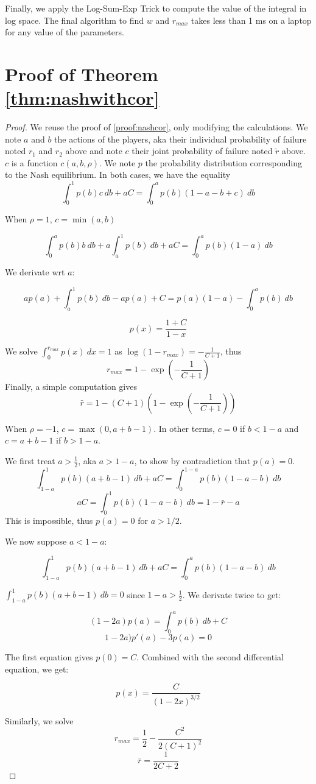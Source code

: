 \documentclass[preprint,12pt,authoryear,doubleblind]{elsarticle}
\theoremstyle{definition}
\begin{document}
Finally, we apply the Log-Sum-Exp Trick to compute the value of the integral in log space. The final algorithm to find $w$ and ${r_{max}}$ takes less than 1 ms on a laptop for any value of the parameters.

\section{Proof of Theorem \ref{thm:nashwithcor}}
\label{proof:nashwithcor}

\nashwithcor*
\begin{proof}
        We reuse the proof of \ref{proof:nashcor}, only modifying the calculations.
    We note $a$ and $b$ the actions of the players, aka their individual probability of failure noted $r_1$ and $r_2$ above and note $c$ their joint probability of failure noted $\tilde r$ above. $c$ is a function $c(a,b,\rho)$. We note $p$ the probability distribution corresponding to the Nash equilibrium.
    In both cases, we have the equality $$\int_0^1 p(b) c~db + a C = \int_0^a p(b)(1-a-b+c)~db$$

    When $\rho = 1$, $c = \min(a, b)$

    $$\int_0^a p(b) b~db + a \int_a^1 p(b)~db + a C = \int_0^a p(b)(1-a)~db$$

    We derivate wrt $a$:

    $$a p(a) + \int_a^1 p(b)~db - ap(a) + C = p(a)(1-a) - \int_0^a p(b)~db$$

    $$p(x) = \frac{1+C}{1-x}$$

    We solve $\int_0^{r_{max}} p(x)~dx=1$ as $\log(1-r_{max}) = -\frac{1}{C+1}$, thus
    $$r_{max} = 1 - \exp\left(-\frac{1}{C+1}\right)$$
    Finally, a simple computation gives $$\bar r = 1 - (C+1)\left(1-\exp\left(-\frac{1}{C+1}\right)\right)$$
    
    

    When $\rho = -1$, $c = \max(0, a+b-1)$. In other terms, $c=0$ if $b<1-a$ and $c=a+b-1$ if $b>1-a$.

    We first treat $a>\frac{1}{2}$, aka $a>1-a$, to show by contradiction that $p(a) = 0$.
    $$\int_{1-a}^1 p(b)(a+b-1)~db+ aC = \int_0^{1-a} p(b)(1-a-b)~db$$
    $$aC = \int_0^1 p(b)(1-a-b)~db = 1 - \bar r - a$$
    This is impossible, thus $p(a) = 0$ for $a> 1/2$.

    We now suppose $a < 1-a$:

    $$\int_{1-a}^1 p(b)(a+b-1)~db + aC = \int_0^a p(b) (1-a-b)~db$$

    $\int_{1-a}^1 p(b)(a+b-1)~db = 0$ since $1-a >  \frac12$.
    We derivate twice to get:

    $$(1-2a)p(a) = \int_0^a p(b)~db + C$$
    $$1-2a) p'(a) - 3p(a) = 0$$

    The first equation gives $p(0) = C$. Combined with the second differential equation, we get:

    $$p(x) =\frac{C}{(1-2x)^{3/2}}$$

    Similarly, we solve  $$r_{max} = \frac{1}{2} - \frac{C^2}{2(C+1)^2}$$
    $$\bar r = \frac{1}{2C+2}$$
\end{proof}
\end{document}
